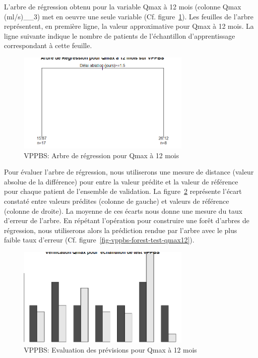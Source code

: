 L'arbre de régression obtenu pour la variable Qmax à 12 mois (colonne Qmax (ml/s)\_\_3) met en oeuvre une seule variable (Cf. figure~\ref{fig-vppbs-regtree-qmax12}). Les feuilles de l'arbre représentent, en première ligne, la valeur approximative pour Qmax à 12 mois. La ligne suivante indique le nombre de patients de l'échantillon d'apprentissage correspondant à cette feuille. 

\begin{figure}[H]
\centering
\includegraphics[width=0.75\textwidth]{../Fig/VPPBS/vppbs-regtree-qmax12.png}
\caption{VPPBS: Arbre de régression pour Qmax à 12 mois}
\label{fig-vppbs-regtree-qmax12}
\end{figure}

Pour évaluer l'arbre de régression, nous utiliserons une mesure de distance (valeur absolue de la différence) pour entre la valeur prédite et la valeur de référence pour chaque patient de l'ensemble de validation. 
La figure~\ref{fig-vppbs-regtree-test-qmax12} représente l'écart constaté entre valeurs prédites (colonne de gauche) et valeurs de référence (colonne de droite). La moyenne de ces écarts nous donne une mesure du taux d'erreur de l'arbre. En répétant l'opération pour construire une forêt d'arbres de régression, nous utiliserons alors la prédiction rendue par l'arbre avec le plus faible taux d'erreur (Cf. figure~\ref{fig-vppbs-forest-test-qmax12}).

\begin{figure}[H]
\centering
\includegraphics[width=0.75\textwidth]{../Fig/VPPBS/vppbs-regtree-test-qmax12.png}
\caption{VPPBS: Evaluation des prévisions pour Qmax à 12 mois}
\label{fig-vppbs-regtree-test-qmax12}
\end{figure}

